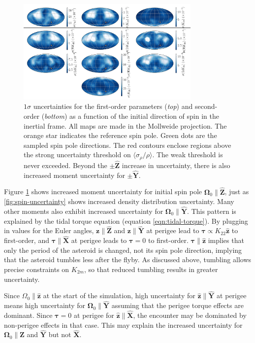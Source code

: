 \documentclass[fleqn,usenatbib]{mnras}
\renewcommand{\unit}[1]{\bm{\hat{#1}}}
\begin{document}
\begin{figure}
  \centering
  \includegraphics[width=0.8\textwidth]{figs/spin-pole}
  \caption{$1\sigma$ uncertainties for the first-order parameters (\textit{top}) and second-order (\textit{bottom}) as a function of the initial direction of spin in the inertial frame. All maps are made in the Mollweide projection. The orange star indicates the reference spin pole. Green dots are the sampled spin pole directions. The red contours enclose regions above the strong uncertainty threshold on $\langle \sigma_\rho / \rho \rangle$. The weak threshold is never exceeded. Beyond the $\pm \unit Z$ increase in uncertainty, there is also increased moment uncertainty for $\pm \unit Y$.}
  \label{fig:scan-spin}
\end{figure}

Figure \ref{fig:scan-spin} shows increased moment uncertainty for initial spin pole $\bm \Omega_0 \parallel \unit Z$, just as \ref{fig:spin-uncertainty} shows increased density distribution uncertainty. Many other moments also exhibit increased uncertainty for $\bm \Omega_0 \parallel \unit Y$. This pattern is explained by the tidal torque equation (equation \ref{eqn:tidal-torque}). By plugging in values for the Euler angles, $\bm z \parallel \unit Z$ and $\bm z \parallel \unit Y$ at perigee lead to $\bm \tau \propto K_{22} \unit z$ to first-order, and $\bm \tau \parallel \unit X$ at perigee leads to $\bm \tau = 0$ to first-order. $\bm \tau \parallel \unit z$ implies that only the period of the asteroid is changed, not its spin pole direction, implying that the asteroid tumbles less after the flyby. As discussed above, tumbling allows precise constraints on $K_{2m}$, so that reduced tumbling results in greater uncertainty.

Since $\Omega_0 \parallel \unit z$ at the start of the simulation, high uncertainty for $\unit z \parallel \unit Y$ at perigee means high uncertainty for $\bm \Omega_0 \parallel \unit Y$ assuming that the perigee torque effects are dominant. Since $\bm \tau = 0$ at perigee for $\unit z \parallel \unit X$, the encounter may be dominated by non-perigee effects in that case. This may explain the increased uncertainty for $\bm \Omega_0 \parallel \unit Z$ and $\unit Y$ but not $\unit X$.
\end{document}

